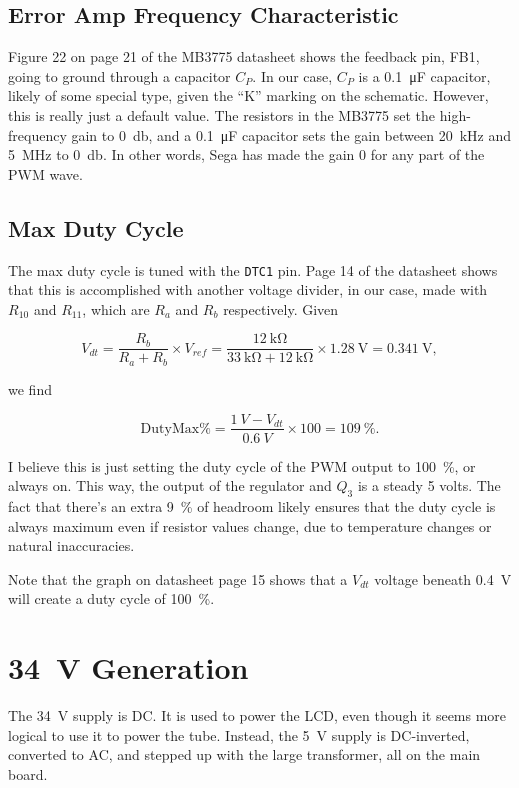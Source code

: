 \documentclass{article}
\newcommand{\chippin}{\texttt}
\begin{document}
\subsection{Error Amp Frequency Characteristic}
Figure 22 on page 21 of the MB3775 datasheet shows the feedback pin,
FB1, going to ground through a capacitor $C_P$. In our case, $C_P$ is
a \qty{0.1}{\micro\farad} capacitor, likely of some special type,
given the ``K'' marking on the schematic. However, this is really just
a default value. The resistors in the MB3775 set the high-frequency
gain to \qty{0}{\decibel}, and a \qty{0.1}{\micro\farad} capacitor
sets the gain between \qty{20}{\kilo\hertz} and \qty{5}{\mega\hertz}
to \qty{0}{\decibel}. In other words, Sega has made the gain 0 for any
part of the PWM wave.

\subsection{Max Duty Cycle}
The max duty cycle is tuned with the \chippin{DTC1} pin. Page 14 of
the datasheet shows that this is accomplished with another voltage
divider, in our case, made with $R_{10}$ and $R_{11}$, which are $R_a$
and $R_b$ respectively. Given

\begin{displaymath}
  V_{dt} = \frac{R_b}{R_a+R_b} \times{} V_{ref} =
  \frac{\qty{12}{\kilo\ohm}}{\qty{33}{\kilo\ohm} + \qty{12}{\kilo\ohm}} \times{}
  \qty{1.28}{\volt} = \qty{0.341}{\volt},
\end{displaymath}

\noindent
we find

\begin{displaymath}
  \mathrm{Duty Max \%} = \frac{\qty{1}{V} - V_{dt}}{\qty{0.6}{V}}
  \times{} 100 = \qty{109}{\%}.
\end{displaymath}

I believe this is just setting the duty cycle of the PWM output to
\qty{100}{\%}, or always on. This way, the output of the regulator and $Q_3$
is a steady 5 volts. The fact that there's an extra \qty{9}{\%} of headroom
likely ensures that the duty cycle is always maximum even if resistor
values change, due to temperature changes or natural inaccuracies.

Note that the graph on datasheet page 15 shows that a $V_{dt}$ voltage
beneath \qty{0.4}{\volt} will create a duty cycle of \qty{100}{\%}.

\section{\qty{34}{\volt} Generation}
The \qty{34}{\volt} supply is DC. It is used to power the LCD, even
though it seems more logical to use it to power the tube. Instead, the
\qty{5}{\volt} supply is DC-inverted, converted to AC, and stepped up
with the large transformer, all on the main board.
\end{document}
